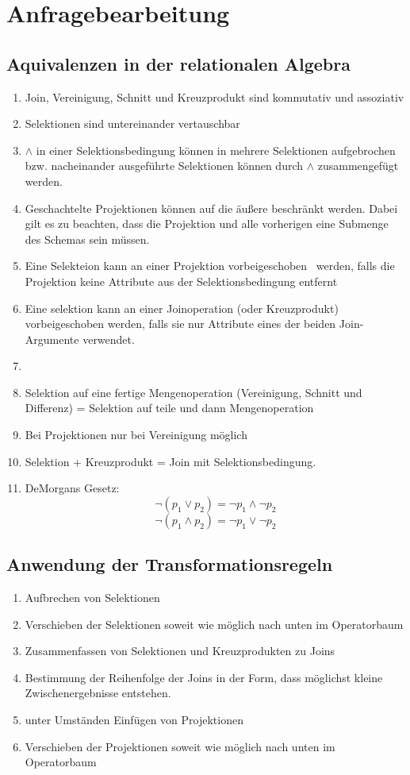 \chapter{Anfragebearbeitung}
\section{Aquivalenzen in der relationalen Algebra}
\begin{enumerate}
\item Join, Vereinigung, Schnitt und Kreuzprodukt sind kommutativ und assoziativ
\item Selektionen sind untereinander vertauschbar
\item $\wedge$ in einer Selektionsbedingung können in mehrere Selektionen aufgebrochen bzw. nacheinander ausgeführte Selektionen können durch $\wedge$ zusammengefügt werden. 
\item Geschachtelte Projektionen können auf die äußere beschränkt werden.
\subitem Dabei gilt es zu beachten, dass die Projektion und alle vorherigen eine Submenge des Schemas sein müssen.
\item Eine Selekteion kann an einer Projektion \grqq vorbeigeschoben\glqq ~ werden, falls die Projektion keine Attribute aus der Selektionsbedingung entfernt
\item Eine selektion kann an einer Joinoperation (oder Kreuzprodukt) vorbeigeschoben werden, falls sie nur Attribute eines der beiden Join-Argumente verwendet. 
\item 
\item Selektion auf eine fertige Mengenoperation (Vereinigung, Schnitt und Differenz) = Selektion auf teile und dann Mengenoperation
\item Bei Projektionen nur bei Vereinigung möglich
\item Selektion + Kreuzprodukt = Join mit Selektionsbedingung. 
\item DeMorgans Gesetz: 
\[\neg(p_1 \vee p_2) = \neg p_1 \wedge \neg p_2 \]
\[\neg(p_1 \wedge p_2) = \neg p_1 \vee \neg p_2\]
\end{enumerate}
\section{Anwendung der Transformationsregeln}
\begin{enumerate}
\item Aufbrechen von Selektionen
\item Verschieben der Selektionen soweit wie möglich nach unten im Operatorbaum
\item Zusammenfassen von Selektionen und Kreuzprodukten zu Joins
\item Bestimmung der Reihenfolge der Joins in der Form, dass möglichst kleine Zwischenergebnisse entstehen.
\item unter Umständen Einfügen von Projektionen
\item Verschieben der Projektionen soweit wie möglich nach unten im Operatorbaum
\end{enumerate}